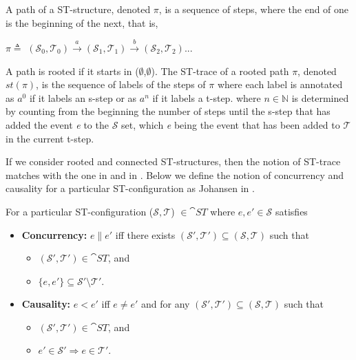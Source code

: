     \begin{definition}
        \label{def:paths and traces}
        A path of a ST-structure, denoted $\pi$, is a sequence of steps, where the end of one is the beginning of the next, that is,
        
        \begin{center}
            $\pi \triangleq$ $(\mathcal{S}_{0},\mathcal{T}_{0})\xrightarrow{a}(\mathcal{S}_{1},\mathcal{T}_{1})\xrightarrow{b}(\mathcal{S}_{2},\mathcal{T}_{2})$...    
        \end{center}
        
        A path is rooted if it starts in ($\emptyset$,$\emptyset$). The ST-trace of a rooted path $\pi$, denoted $st(\pi)$, is the sequence of labels of the steps of $\pi$ where each label is annotated as $a^{0}$ if it labels an s-step or as $a^{n}$ if it labels a t-step. where $n \in  \mathbb{N}$ is determined by counting from the beginning the number of steps until the s-step that has added the event \emph{e} to the $\mathcal{S}$ set, which \emph{e} being the event that has been added to $\mathcal{T}$ in the current t-step.
    \end{definition}
    
    If we consider rooted and connected ST-structures, then the notion of ST-trace matches with the one in \cite[Definition 2.5]{GlabbeekV97splitting} and in \cite[Section 7.3]{Glabbeek06HDA}. Below we define the notion of concurrency and causality for a particular ST-configuration as Johansen in \cite{Johansen16STstruct}.
    
    \begin{definition}
        \label{def:ST concurrency and causality}
        For a particular ST-configuration ($\mathcal{S},\mathcal{T}$) $\in \cat{ST}$ where $e, e' \in \mathcal{S}$ satisfies
        
        \begin{itemize}
            \item \textbf{Concurrency:} $e \parallel e'$ iff there exists $(\mathcal{S}',\mathcal{T}') \subseteq (\mathcal{S},\mathcal{T})$ such that
            \begin{itemize}
                \item $(\mathcal{S}',\mathcal{T}') \in \cat{ST}$, and
                \item $\{e,e'\} \subseteq \mathcal{S}' \setminus \mathcal{T}'$.
            \end{itemize}
            \item \textbf{Causality:} $e < e'$ iff $e \neq e'$ and for any $(\mathcal{S}',\mathcal{T}') \subseteq (\mathcal{S},\mathcal{T})$ such that
            \begin{itemize}
                \item $(\mathcal{S}',\mathcal{T}') \in \cat{ST}$, and
                \item $e' \in \mathcal{S}' \Rightarrow e \in \mathcal{T}'$.
            \end{itemize}
        \end{itemize}
    \end{definition}
    
